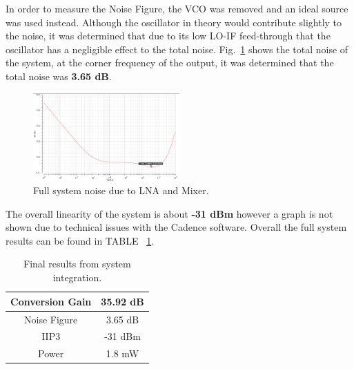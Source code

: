 In order to measure the Noise Figure, the VCO was removed and an ideal source was used instead. Although the oscillator in theory would contribute slightly to the noise, it was determined that due to its low LO-IF feed-through that the oscillator has a negligible effect to the total noise. Fig.~\ref{fig:fullsystemnoise} shows the total noise of the system, at the corner frequency of the output, it was determined that the total noise was {\bf 3.65 dB}.

\begin{figure}[h]
   \centering
    \includegraphics[width=0.5\textwidth]{figures/FullSysNoiseFigure.png}
    \caption{Full system noise due to LNA and Mixer.}
    \label{fig:fullsystemnoise}
\end{figure}

The overall linearity of the system is about {\bf -31 dBm} however a graph is not shown due to technical issues with the Cadence software. Overall the full system results can be found in TABLE ~\ref{tab:systemresults}.


\begin{table}[H]
\caption{Final results from system integration.}
\label{tab:systemresults}
\begin{center}
	\begin{tabular}{ c | c  }

  		Conversion Gain & 35.92 dB \\ \hline
  		Noise Figure & 3.65 dB \\ \hline
  		IIP3 & -31 dBm\\ \hline
		Power & 1.8 mW \\

	\end{tabular}

\end{center}

\end{table}
